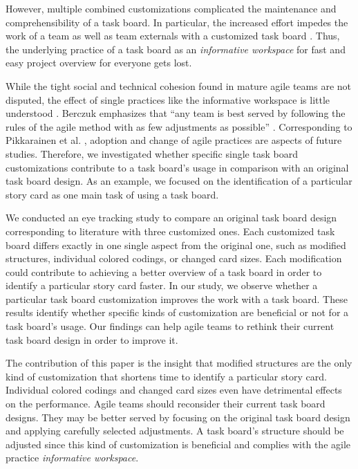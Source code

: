 \documentclass{llncs}
\begin{document}
However, multiple combined customizations complicated the maintenance and 
comprehensibility of a task board. In particular, the increased effort impedes 
the work of a team as well as team externals with a customized task board 
\cite{Hajratwala.2012, Liskin.2014, Sharp.2009}. Thus, the underlying practice 
of a task board as an \textit{informative workspace} for fast and easy project 
overview for everyone gets lost.

While the tight social and technical cohesion found in mature agile teams are 
not disputed, the effect of single practices like the informative 
workspace is little understood \cite{Sharp.2009}. Berczuk emphasizes that ``any 
team is best served by following the rules of the agile method with as few 
adjustments as possible'' \cite[p. 6]{Berczuk.2007}. Corresponding to 
Pikkarainen et al. \cite{Pikkarainen.2008}, adoption and change of agile 
practices are aspects of future studies. Therefore, we investigated whether 
specific single task board customizations contribute to a task board's usage 
in comparison with an original task board design. As an example, we focused on 
the identification of a particular story card as one main task of using a task 
board.

We conducted an eye tracking study to compare an original task board design 
corresponding to literature \cite{Cohn.2012, Perry.2008} with three customized 
ones. Each customized task board differs exactly in one single aspect from the 
original one, such as modified structures, individual colored codings, or 
changed card sizes. Each modification could contribute to achieving a better 
overview of a task board in order to identify a particular story card faster. 
In our study, we observe whether a particular task board customization improves 
the work with a task board. These results identify whether specific kinds of 
customization are beneficial or not for a task board's usage. Our findings can 
help agile teams to rethink their current task board design in order to improve 
it.

The contribution of this paper is the insight that modified structures are the 
only kind of customization that shortens time to identify a particular story 
card. Individual colored codings and changed card sizes even have detrimental 
effects on the performance. Agile teams should reconsider their current task 
board designs. They may be better served by focusing on the original task board 
design and applying carefully selected adjustments. A task board's structure 
should be adjusted since this kind of customization is beneficial and complies 
with the agile practice \textit{informative workspace}.
\end{document}
